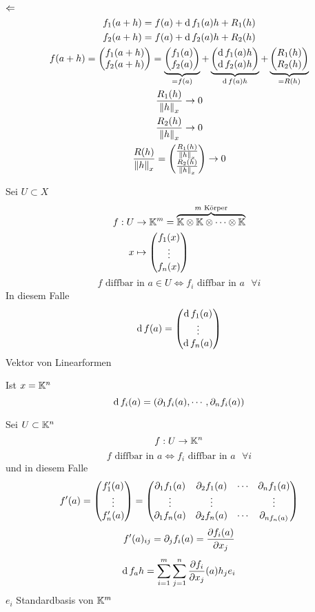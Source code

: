 \begin{Bew}
  $\Leftarrow$
  \begin{gather*}
    f_1(a+h)=f(a)+\operatorname{d} f_1(a)h+R_1(h)\\
    f_2(a+h)=f(a)+\operatorname{d} f_2(a)h+R_2(h)\\
    f(a+h)=\begin{pmatrix}f_1(a+h)\\f_2(a+h)\end{pmatrix}=\underbrace{\begin{pmatrix}f_1(a)\\f_2(a)\end{pmatrix}}_{=f(a)}+\underbrace{\begin{pmatrix}\operatorname{d} f_1(a)h\\\operatorname{d} f_2(a)h\end{pmatrix}}_{\operatorname{d} f(a)h}+\underbrace{\begin{pmatrix}R_1(h)\\R_2(h)\end{pmatrix}}_{=R (h)}\\
    \frac{R_1(h)}{\left\| h \right\|_x}\to 0\\
    \frac{R_2(h)}{\left\| h \right\|_x}\to 0\\
    \frac{R(h)}{\left\| h \right\|_x}=\begin{pmatrix}\frac{R_1(h)}{\left\| h \right\|_x}\\\frac{R_2(h)}{\left\| h \right\|_x}\end{pmatrix}\to 0
  \end{gather*}
\end{Bew}
\begin{Kor}
  Sei $U\subset X$
  \begin{align*}
    f:U&\to\mathbb{K}^m=\overbrace{\mathbb{K}\otimes\mathbb{K}\otimes\cdots\otimes\mathbb{K}}^{\text{$m$ Körper}}\\
    x&\mapsto \begin{pmatrix}f_1(x)\\\vdots\\f_n(x)\end{pmatrix}
  \end{align*}
  \[\text{$f$ diffbar in $a\in U$}\iff\text{$f_i$ diffbar in $a$ $\forall i$}\]
  In diesem Falle
  \[\operatorname{d} f(a)=\begin{pmatrix}\operatorname{d} f_1(a)\\\vdots\\\operatorname{d} f_n(a)\end{pmatrix}\]
  Vektor von Linearformen
\end{Kor}
\begin{Bem}
  Ist $x=\mathbb{K}^n$
  \[\operatorname{d} f_i(a)=\left( \partial_1f_i(a),\cdots,\partial_nf_i(a) \right)\]
\end{Bem}
\begin{Kor}
  Sei $U\subset\mathbb{K}^n$
  \[f:U\to\mathbb{K}^n\]
  \[\text{$f$ diffbar in $a$}\iff\text{$f_i$ diffbar in $a$ $\forall i$}\]
  und in diesem Falle
  \begin{gather*}
    f'(a)=\begin{pmatrix}f_1'(a)\\\vdots\\f_n'(a)\end{pmatrix}=\begin{pmatrix}\partial_1f_1(a)&\partial_2f_1(a)&\cdots&\partial_nf_1(a)\\\vdots&\vdots&&\vdots\\\partial_1f_n(a)&\partial_2f_n(a)&\cdots&\partial_{nf_n(a)}\end{pmatrix}\\
  \end{gather*}
  \[f'(a)_{ij}=\partial_jf_i(a)=\dfrac{\partial f_i(a)}{\partial x_j}\]
  \begin{gather*}
    \operatorname{d} f_ah=\sum_{i=1}^m\sum_{j=1}^n\dfrac{\partial f_i}{\partial x_j}(a)h_je_i
  \end{gather*}
  $e_i$  Standardbasis von $\mathbb{K}^m$
\end{Kor}
